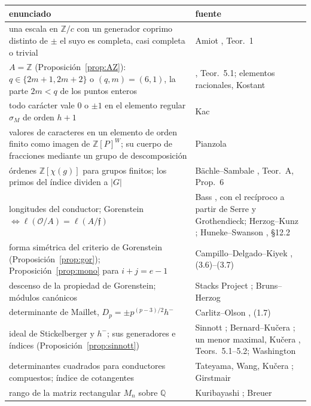 \documentclass[11pt,a4paper]{article}
\theoremstyle{definition}
\newcommand{\ZZ}{\mathbb{Z}}
\newcommand{\QQ}{\mathbb{Q}}
\newcommand{\cO}{\mathcal{O}}
\newcommand{\cf}{\mathfrak{f}}
\begin{document}
\begin{center}\small
{}
\begin{tabular}{p{}p{}}
\toprule
enunciado & fuente \\
\midrule
una escala en $\ZZ/c$ con un generador coprimo distinto de $\pm$ el suyo es completa, casi completa o trivial & Amiot \cite{Ami09}, Teor.~1 \\
$A=\ZZ$ (Proposición~\ref{prop:AZ}): $q\in\{2m+1,2m+2\}$ o $(q,m)=(6,1)$, la parte $2m<q$ de los puntos enteros & \cite{Mar26}, Teor.~5.1; elementos racionales, Kostant \cite[Teor.~3.1]{Kostant76} \\
todo carácter vale $0$ o $\pm1$ en el elemento regular $\sigma_M$ de orden $h+1$ & Kac \cite[\S\S0--1]{Kac81} \\
valores de caracteres en un elemento de orden finito como imagen de $\ZZ[P]^W$; su cuerpo de fracciones mediante un grupo de descomposición & Pianzola \cite[Teor.~1 y Prop.~10]{Pia87} \\
órdenes $\ZZ[\chi(g)]$ para grupos finitos; los primos del índice dividen a $|G|$ & Bächle--Sambale \cite{BS20}, Teor.~A, Prop.~6 \\
longitudes del conductor; Gorenstein $\iff\ell(\cO/A)=\ell(A/\cf)$ & Bass \cite[Cor.~(6.5)]{Bas63}, con el recíproco a partir de Serre y Grothendieck; Herzog--Kunz \cite{HK71}; Huneke--Swanson \cite{HS06}, §12.2 \\
forma simétrica del criterio de Gorenstein (Proposición~\ref{prop:gor}); Proposición~\ref{prop:mono} para $i+j=e-1$ & Campillo--Delgado--Kiyek \cite{CDK94}, (3.6)--(3.7) \\
descenso de la propiedad de Gorenstein; módulos canónicos & Stacks Project \cite[Tag~0BJL]{Stacks}; Bruns--Herzog \cite[Teor.~3.3.6, Prop.~3.3.18]{BH98} \\
determinante de Maillet, $D_p=\pm p^{(p-3)/2}h^-$ & Carlitz--Olson \cite{CO55}, (1.7) \\
ideal de Stickelberger y $h^-$; sus generadores e índices (Proposición~\ref{prop:sinnott}) & Sinnott \cite{Sin78,Sin80}; Bernard--Kučera \cite{BK24}; un menor maximal, Kučera \cite{Kuc92}, Teors.~5.1--5.2; Washington \cite{Was97} \\
determinantes cuadrados para conductores compuestos; índice de cotangentes & Tateyama, Wang, Kučera \cite{Kuc01}; Girstmair \cite{Gir89} \\
rango de la matriz rectangular $M_n$ sobre $\QQ$ & Kuribayashi \cite{Kur08}; Breuer \cite{Bre00} \\

\end{tabular}
\end{center}
\end{document}
